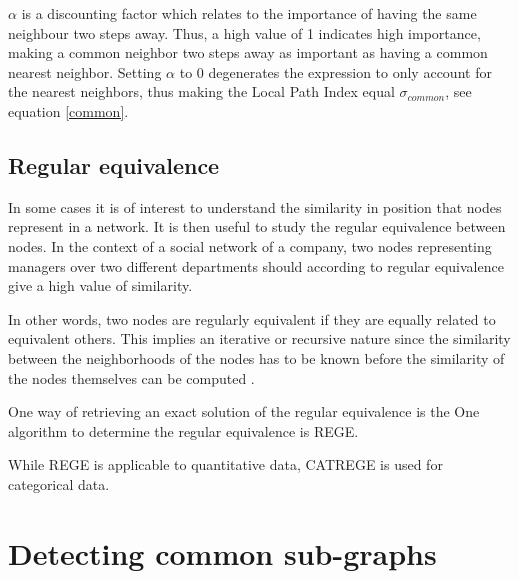$\alpha$ is a discounting factor which relates to the importance of having the same neighbour two steps away. Thus, a high value of 1 indicates high importance, making a common neighbor two steps away as important as having a common nearest neighbor. Setting $\alpha$ to 0 degenerates the expression to only account for the nearest neighbors, thus making the Local Path Index equal $\sigma_{common}$, see equation \eqref{common}.



\subsection{Regular equivalence}
In some cases it is of interest to understand the similarity in position that nodes represent in a network.  It is then useful to study the regular equivalence between nodes. In the context of a social network of a company, two nodes representing managers over two different departments should according to regular equivalence give a high value of similarity. 

In other words, two nodes are regularly equivalent if they are equally related to equivalent others. This implies an iterative or recursive nature since the similarity between the neighborhoods of the nodes has to be known before the similarity of the nodes themselves can be computed \cite{leicht2006}. 

One way of retrieving an exact solution of the regular equivalence is the 
One algorithm to determine the regular equivalence is REGE. 

While REGE is applicable to quantitative data, CATREGE is used for categorical data. 


\section{Detecting common sub-graphs}


